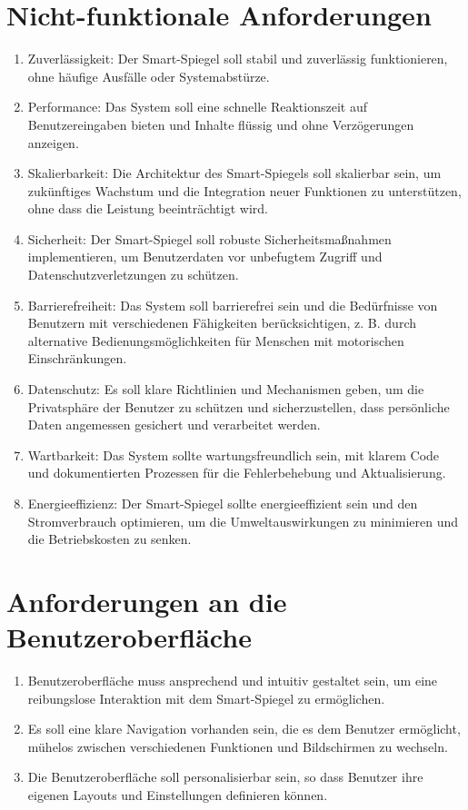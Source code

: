 \documentclass{article}
\begin{document}
\section{Nicht-funktionale Anforderungen}
\begin{enumerate}[label=\textbf{NFA\arabic*:}]
    \item Zuverlässigkeit: Der Smart-Spiegel soll stabil und zuverlässig funktionieren, ohne häufige Ausfälle oder Systemabstürze.
    \item Performance: Das System soll eine schnelle Reaktionszeit auf Benutzereingaben bieten und Inhalte flüssig und ohne Verzögerungen anzeigen.
    \item Skalierbarkeit: Die Architektur des Smart-Spiegels soll skalierbar sein, um zukünftiges Wachstum und die Integration neuer Funktionen zu unterstützen, ohne dass die Leistung beeinträchtigt wird.
    \item Sicherheit: Der Smart-Spiegel soll robuste Sicherheitsmaßnahmen implementieren, um Benutzerdaten vor unbefugtem Zugriff und Datenschutzverletzungen zu schützen.
    \item Barrierefreiheit: Das System soll barrierefrei sein und die Bedürfnisse von Benutzern mit verschiedenen Fähigkeiten berücksichtigen, z. B. durch alternative Bedienungsmöglichkeiten für Menschen mit motorischen Einschränkungen.
    \item Datenschutz: Es soll klare Richtlinien und Mechanismen geben, um die Privatsphäre der Benutzer zu schützen und sicherzustellen, dass persönliche Daten angemessen gesichert und verarbeitet werden.
    \item Wartbarkeit: Das System sollte wartungsfreundlich sein, mit klarem Code und dokumentierten Prozessen für die Fehlerbehebung und Aktualisierung.
    \item Energieeffizienz: Der Smart-Spiegel sollte energieeffizient sein und den Stromverbrauch optimieren, um die Umweltauswirkungen zu minimieren und die Betriebskosten zu senken.
\end{enumerate}

\section{Anforderungen an die Benutzeroberfläche}
\begin{enumerate}[label=\textbf{B\arabic*:}]
    \item Benutzeroberfläche muss ansprechend und intuitiv gestaltet sein, um eine reibungslose Interaktion mit dem Smart-Spiegel zu ermöglichen.
    \item Es soll eine klare Navigation vorhanden sein, die es dem Benutzer ermöglicht, mühelos zwischen verschiedenen Funktionen und Bildschirmen zu wechseln.
    \item Die Benutzeroberfläche soll personalisierbar sein, so dass Benutzer ihre eigenen Layouts und Einstellungen definieren können.
\end{enumerate}
\end{document}
